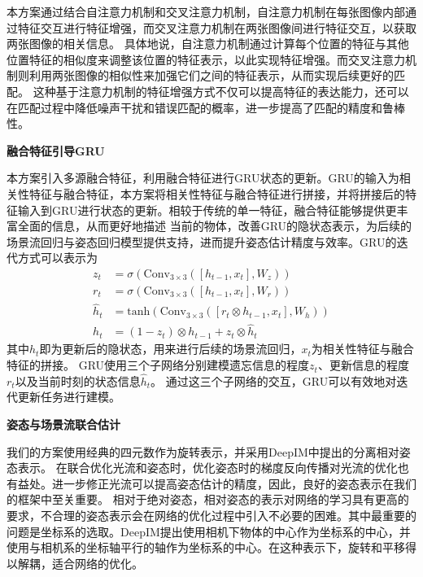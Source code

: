 \documentclass[12pt]{article}
\begin{document}
本方案通过结合自注意力机制和交叉注意力机制，自注意力机制在每张图像内部通过特征交互进行特征增强，而交叉注意力机制在两张图像间进行特征交互，以获取两张图像的相关信息。
具体地说，自注意力机制通过计算每个位置的特征与其他位置特征的相似度来调整该位置的特征表示，以此实现特征增强。而交叉注意力机制则利用两张图像的相似性来加强它们之间的特征表示，从而实现后续更好的匹配。
这种基于注意力机制的特征增强方式不仅可以提高特征的表达能力，还可以在匹配过程中降低噪声干扰和错误匹配的概率，进一步提高了匹配的精度和鲁棒性。





\textbf{融合特征引导GRU}

本方案引入多源融合特征，利用融合特征进行GRU状态的更新。GRU的输入为相关性特征与融合特征，本方案将相关性特征与融合特征进行拼接，并将拼接后的特征输入到GRU进行状态的更新。相较于传统的单一特征，融合特征能够提供更丰富全面的信息，从而更好地描述
当前的物体，改善GRU的隐状态表示，为后续的场景流回归与姿态回归模型提供支持，进而提升姿态估计精度与效率。GRU的迭代方式可以表示为
\begin{equation}
    \begin{aligned}
        z_t &= \sigma(\mathrm{Conv}_{3\times3}([h_{t-1}, x_t], W_z)) \\
        r_t &= \sigma(\mathrm{Conv}_{3\times3}([h_{t-1}, x_t], W_r)) \\
        \hat{h}_t &= \mathrm{tanh}(\mathrm{Conv}_{3\times3}([r_t \otimes h_{t-1}, x_t], W_h)) \\
        h_t &= (1 - z_t)\otimes h_{t-1} + z_t \otimes \hat{h}_t
    \end{aligned}
\end{equation}
其中$h_t$即为更新后的隐状态，用来进行后续的场景流回归，$x_t$为相关性特征与融合特征的拼接。
GRU使用三个子网络分别建模遗忘信息的程度$z_t$、更新信息的程度$r_t$以及当前时刻的状态信息$\hat{h}_t$。
通过这三个子网络的交互，GRU可以有效地对迭代更新任务进行建模。

\textbf{姿态与场景流联合估计}

我们的方案使用经典的四元数作为旋转表示，并采用DeepIM中提出的分离相对姿态表示。
在联合优化光流和姿态时，优化姿态时的梯度反向传播对光流的优化也有益处。进一步修正光流可以提高姿态估计的精度，因此，良好的姿态表示在我们的框架中至关重要。
相对于绝对姿态，相对姿态的表示对网络的学习具有更高的要求，不合理的姿态表示会在网络的优化过程中引入不必要的困难。其中最重要的问题是坐标系的选取。DeepIM提出使用相机下物体的中心作为坐标系的中心，并使用与相机系的坐标轴平行的轴作为坐标系的中心。在这种表示下，旋转和平移得以解耦，适合网络的优化。
\end{document}
